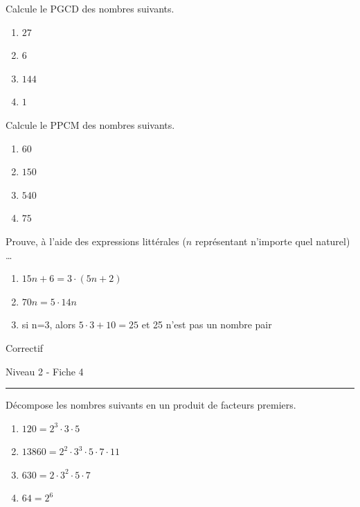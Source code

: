 \documentclass[12pt,parskip=half-, twoside=semi]{scrartcl}
\begin{document}
      \begin{exercise}
        Calcule le PGCD des nombres suivants.
          \begin{enumerate}[cols=2]
            \item $27$
            \item $6$
            \item $144$
            \item $1$
          \end{enumerate}
      \end{exercise}
      
      \begin{exercise}
        Calcule le PPCM des nombres suivants.
          \begin{enumerate}[cols=2]
            \item $60$
            \item $150$
            \item $540$
            \item $75$
          \end{enumerate}
      \end{exercise}
      
      \begin{exercise}
        Prouve, à l'aide des expressions littérales (\(n\) représentant n'importe quel naturel) \dots 
        \begin{enumerate}
          \item \(15n + 6 = 3 \cdot (5n+2)\)
          \item \(70n = 5 \cdot 14n\)
          \item si n=3, alors \(5\cdot 3 + 10 = 25\) et 25 n'est pas un nombre pair
        \end{enumerate}
      \end{exercise}
      
\newpage

\begin{center}
  \bfseries
  \begin{Huge}
  Correctif
  \end{Huge}
  \smallbreak
  \begin{large}
  Niveau 2  - Fiche 4
  \end{large}
  \smallbreak
  \rule[10pt]{.5\linewidth}{1 pt}
  \end{center}

\setcounter{exercise}{0}
  
  \begin{exercise}
    Décompose les nombres suivants en un produit de facteurs premiers.
      \begin{enumerate}[cols=2]
        \item $120 = 2^3 \cdot  3 \cdot 5$
        \item $13 860 = 2^2 \cdot 3^3 \cdot 5 \cdot 7 \cdot 11$
        \item $630 = 2 \cdot 3^2 \cdot 5 \cdot 7$
        \item $64 = 2^6$
      \end{enumerate}
  \end{exercise}
  
\end{document}

